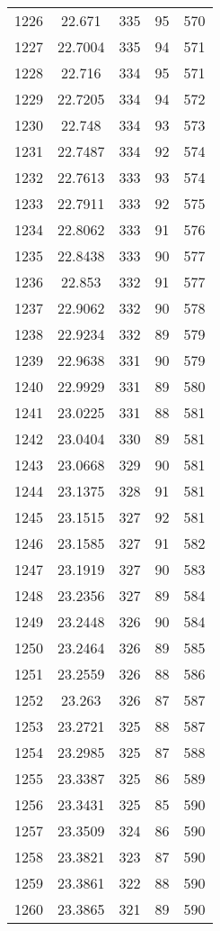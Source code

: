 \documentclass[12pt,a4paper]{article}
\begin{document}
\begin{tabular}{r|cccc}
	1226 & 22.671 & 335 & 95 & 570 \\
	1227 & 22.7004 & 335 & 94 & 571 \\
	1228 & 22.716 & 334 & 95 & 571 \\
	1229 & 22.7205 & 334 & 94 & 572 \\
	1230 & 22.748 & 334 & 93 & 573 \\
	1231 & 22.7487 & 334 & 92 & 574 \\
	1232 & 22.7613 & 333 & 93 & 574 \\
	1233 & 22.7911 & 333 & 92 & 575 \\
	1234 & 22.8062 & 333 & 91 & 576 \\
	1235 & 22.8438 & 333 & 90 & 577 \\
	1236 & 22.853 & 332 & 91 & 577 \\
	1237 & 22.9062 & 332 & 90 & 578 \\
	1238 & 22.9234 & 332 & 89 & 579 \\
	1239 & 22.9638 & 331 & 90 & 579 \\
	1240 & 22.9929 & 331 & 89 & 580 \\
	1241 & 23.0225 & 331 & 88 & 581 \\
	1242 & 23.0404 & 330 & 89 & 581 \\
	1243 & 23.0668 & 329 & 90 & 581 \\
	1244 & 23.1375 & 328 & 91 & 581 \\
	1245 & 23.1515 & 327 & 92 & 581 \\
	1246 & 23.1585 & 327 & 91 & 582 \\
	1247 & 23.1919 & 327 & 90 & 583 \\
	1248 & 23.2356 & 327 & 89 & 584 \\
	1249 & 23.2448 & 326 & 90 & 584 \\
	1250 & 23.2464 & 326 & 89 & 585 \\
	1251 & 23.2559 & 326 & 88 & 586 \\
	1252 & 23.263 & 326 & 87 & 587 \\
	1253 & 23.2721 & 325 & 88 & 587 \\
	1254 & 23.2985 & 325 & 87 & 588 \\
	1255 & 23.3387 & 325 & 86 & 589 \\
	1256 & 23.3431 & 325 & 85 & 590 \\
	1257 & 23.3509 & 324 & 86 & 590 \\
	1258 & 23.3821 & 323 & 87 & 590 \\
	1259 & 23.3861 & 322 & 88 & 590 \\
	1260 & 23.3865 & 321 & 89 & 590 \\

\end{tabular}
\end{document}
